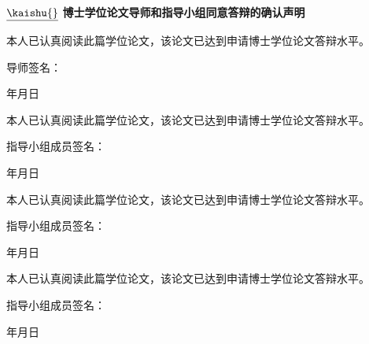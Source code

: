 \newpage
\pagestyle{empty}

\vskip 2cm

\begin{center}
  \bf\Large $\underline{\mbox{\kaishu {}}}\,\,$博士学位论文导师和指导小组同意答辩的确认声明
\end{center}

\vskip 1cm

\normalsize
本人已认真阅读此篇学位论文，该论文已达到申请博士学位论文答辩水平。

\vskip 1cm

\hfill 导师签名：\underline{\hspace{5cm}}

\vskip 0.3cm

\hfill 年\qquad 月\qquad 日

\vskip 2cm

\normalsize
本人已认真阅读此篇学位论文，该论文已达到申请博士学位论文答辩水平。

\vskip 0.8cm

\hfill 指导小组成员签名：\underline{\hspace{5cm}}

\hfill 年\qquad 月\qquad 日

\vskip 2cm

\normalsize
本人已认真阅读此篇学位论文，该论文已达到申请博士学位论文答辩水平。

\vskip 0.8cm

\hfill 指导小组成员签名：\underline{\hspace{5cm}}

\hfill 年\qquad 月\qquad 日

\vskip 2cm

\normalsize
本人已认真阅读此篇学位论文，该论文已达到申请博士学位论文答辩水平。

\vskip 0.8cm

\hfill 指导小组成员签名：\underline{\hspace{5cm}}

\hfill 年\qquad 月\qquad 日
